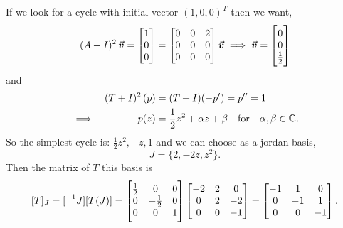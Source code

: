 \documentclass[../MathsNotesBase.tex]{subfiles}
\begin{document}
\begin{exe}
{			If we look for a cycle with initial vector $(1,0,0)^T$ then we want,
			\[ (A + I)^2\,\vec{\bm{v}} = \begin{bmatrix}1\\0\\0\end{bmatrix} = 
				\begin{bmatrix}
					0 & 0 & 2\\
					0 & 0 & 0\\
					0 & 0 & 0
				\end{bmatrix}\vec{\bm{v}} \implies
				\vec{\bm{v}} = \begin{bmatrix}0\\0\\\frac{1}{2}\end{bmatrix}
			\]
			and
			\[\begin{aligned}
				&& (T + I)^2\,(p) &= (T + I)(-p') = p'' = 1 \\
				&\implies & p(z) &= \frac{1}{2}z^2 + \alpha z + \beta \hspace{10pt}\text{for}\hspace{10pt} \alpha,\beta \in \mathbb{C}^{}.
			\end{aligned}\]
			So the simplest cycle is: ${ \frac{1}{2}z^2, -z, 1 }$ and we can choose as a jordan basis,
			\[ J = \{ 2, -2z, z^2 \}. \]
			Then the matrix of $T$ \wrt this basis is
			\[ [T]_J = {[}^{-1}J][T(J)] = 	
				\begin{bmatrix}
					\frac{1}{2} & 0 & 0\\
					0 & -\frac{1}{2} & 0\\
					0 & 0 & 1
				\end{bmatrix}
				\begin{bmatrix}
					-2 & 2 & 0\\
					0 & 2 & -2\\
					0 & 0 & -1
				\end{bmatrix} =
				\begin{bmatrix}
					-1 & 1 & 0\\
					0 & -1 & 1\\
					0 & 0 & -1
				\end{bmatrix}.
			\]
		}
	\end{exe}


\end{document}
